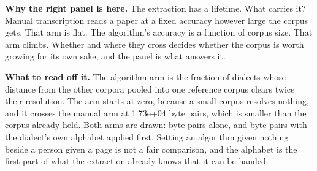 \textbf{Why the right panel is here.} The extraction has a lifetime. What carries it? Manual transcription reads a paper at a fixed accuracy however large the corpus gets. That arm is flat. The algorithm's accuracy is a function of corpus size. That arm climbs. Whether and where they cross decides whether the corpus is worth growing for its own sake, and the panel is what answers it.

\textbf{What to read off it.} The algorithm arm is the fraction of dialects whose distance from the other corpora pooled into one reference corpus clears twice their resolution. The arm starts at zero, because a small corpus resolves nothing, and it crosses the manual arm at 1.73e+04 byte pairs, which is smaller than the corpus already held. Both arms are drawn: byte pairs alone, and byte pairs with the dialect's own alphabet applied first. Setting an algorithm given nothing beside a person given a page is not a fair comparison, and the alphabet is the first part of what the extraction already knows that it can be handed.


